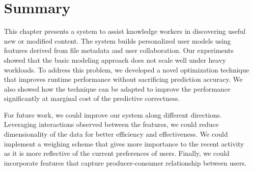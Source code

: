 \section{Summary}
\label{sec:conclusion}

This chapter presents a system to assist knowledge workers in
discovering useful new or modified content.  The system builds
personalized user models using features derived from file metadata and
user collaboration.  Our experiments showed that the basic modeling
approach does not scale well under heavy workloads. To address this
problem, we developed a novel optimization technique that improves
runtime performance without sacrificing prediction accuracy.  We also
showed how the technique can be adapted to improve the performance
significantly at marginal cost of the predictive correctness.

For future work, we could improve our system along different
directions.  Leveraging interactions observed between the features, we
could reduce dimensionality of the data for better efficiency and
effectiveness.  We could implement a weighing scheme that gives more
importance to the recent activity as it is more reflective of the
current preferences of users.  Finally, we could incorporate features
that capture producer-consumer relationship between users.


